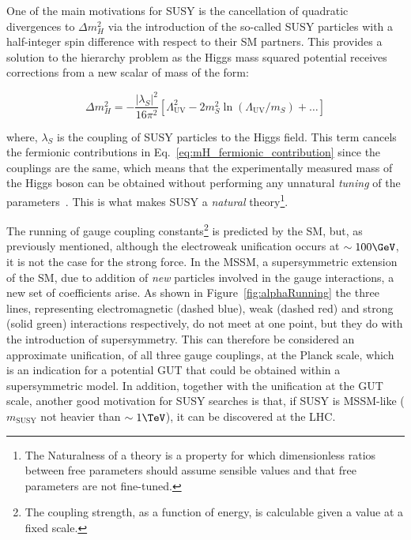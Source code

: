 

		One of the main motivations for \ac{SUSY} is the cancellation of quadratic divergences to $\Delta m_H^2$ via the introduction of the so-called \ac{SUSY} particles with a half-integer spin difference with respect to their \ac{SM} partners. This provides a solution to the hierarchy problem as the Higgs mass squared potential receives corrections from a new scalar of mass of the form:

		\begin{equation}
		\label{eq:mH_scalar_contribution}
			\Delta m_H^2 = - \frac{\left | \lambda_S \right |^2}{16 \pi ^2} \left [  \Lambda_{\mathrm{UV}}^2 - 2m_S^2 \ln \left (\Lambda_{\mathrm{UV}} / m_S \right) + \dots \right ]
		\end{equation}

		\noindent where, $\lambda_S$ is the coupling of \ac{SUSY} particles to the Higgs field. This term cancels the fermionic contributions in Eq.~\ref{eq:mH_fermionic_contribution} since the couplings are the same, which means that the experimentally measured mass of the Higgs boson can be obtained without performing any unnatural \emph{tuning} of the parameters~\cite{susyprimer,Barbieri:1987fn}. This is what makes \ac{SUSY} a \emph{natural} theory\footnote{The Naturalness of a theory is a property for which dimensionless ratios between free parameters should assume sensible values and that free parameters are not fine-tuned.}.

		The running of gauge coupling constants\footnote{The  coupling strength, as a function of energy, is calculable given a value at a fixed scale.} is predicted by the \ac{SM}, but, as previously mentioned, although the electroweak unification occurs at $\sim 100 \GeV$, it is not the case for the strong force. In the \ac{MSSM}, a supersymmetric extension of the \ac{SM}, due to addition of \emph{new} particles involved in the gauge interactions, a new set of coefficients arise. As shown in Figure~\ref{fig:alphaRunning} the three lines, representing electromagnetic (dashed blue), weak (dashed red) and strong (solid green) interactions respectively, do not meet at one point, but they do with the introduction of supersymmetry. This can therefore be considered an approximate unification, of all three gauge couplings, at the Planck scale, which is an indication for a potential \ac{GUT} that could be obtained within a supersymmetric model. In addition, together with the unification at the \ac{GUT} scale, another good motivation for \ac{SUSY} searches is that, if \ac{SUSY} is \ac{MSSM}-like ($m_{\mathrm{SUSY}}$ not heavier than $\sim 1 \TeV$), it can be discovered at the \ac{LHC}.  
	
